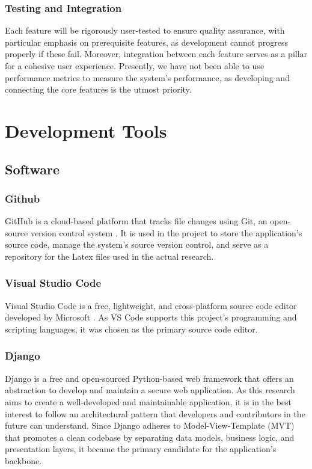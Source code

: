 \subsubsection{Testing and Integration}
Each feature will be rigorously user-tested to ensure quality assurance, with particular emphasis on prerequisite features, as development cannot progress properly if these fail. Moreover, integration between each feature serves as a pillar for a cohesive user experience. Presently, we have not been able to use performance metrics to measure the system's performance, as developing and connecting the core features is the utmost priority. 

\section{Development Tools}
\subsection{Software}

\subsubsection{Github}
GitHub is a cloud-based platform that tracks file changes using Git, an open-source version control system \cite{github-no-date}. It is used in the project to store the application's source code, manage the system's source version control, and serve as a repository for the Latex files used in the actual research.

\subsubsection{Visual Studio Code}
Visual Studio Code is a free, lightweight, and cross-platform source code editor developed by Microsoft \cite{vscode-2021}. As VS Code supports this project's programming and scripting languages, it was chosen as the primary source code editor.

\subsubsection{Django}
Django is a free and open-sourced Python-based web framework that offers an abstraction to develop and maintain a secure web application. As this research aims to create a well-developed and maintainable application, it is in the best interest to follow an architectural pattern that developers and contributors in the future can understand. Since Django adheres to Model-View-Template (MVT) that promotes a clean codebase by separating data models, business logic, and presentation layers, it became the primary candidate for the application's backbone. 


